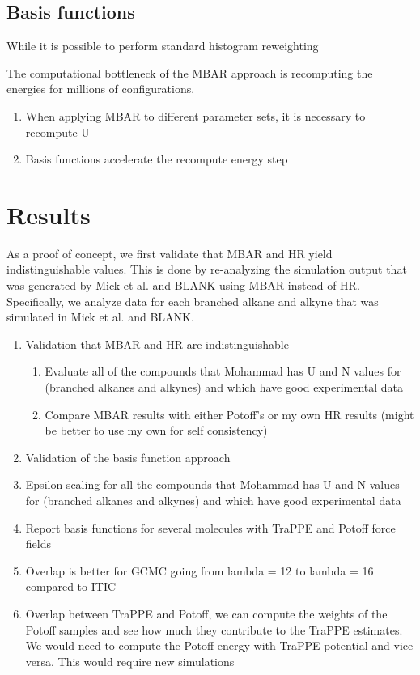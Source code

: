 \documentclass[11pt,a4paper]{article}
\begin{document}
\subsection{Basis functions}

While it is possible to perform standard histogram reweighting 

The computational bottleneck of the MBAR approach is recomputing the energies for millions of configurations. 

\begin{enumerate}
	\item When applying MBAR to different parameter sets, it is necessary to recompute U
	\item Basis functions accelerate the recompute energy step
\end{enumerate}

\section{Results}

As a proof of concept, we first validate that MBAR and HR yield indistinguishable values. This is done by re-analyzing the simulation output that was generated by Mick et al. and BLANK using MBAR instead of HR. Specifically, we analyze data for each branched alkane and alkyne that was simulated in Mick et al. and BLANK.  

\begin{enumerate}
	\item Validation that MBAR and HR are indistinguishable
	\begin{enumerate}
		\item Evaluate all of the compounds that Mohammad has U and N values for (branched alkanes and alkynes) and which have good experimental data
		\item Compare MBAR results with either Potoff's or my own HR results (might be better to use my own for self consistency)
	\end{enumerate}
    \item Validation of the basis function approach
    \item Epsilon scaling for all the compounds that Mohammad has U and N values for (branched alkanes and alkynes) and which have good experimental data
    \item Report basis functions for several molecules with TraPPE and Potoff force fields
    \item Overlap is better for GCMC going from lambda = 12 to lambda = 16 compared to ITIC
    \item Overlap between TraPPE and Potoff, we can compute the weights of the Potoff samples and see how much they contribute to the TraPPE estimates. We would need to compute the Potoff energy with TraPPE potential and vice versa. This would require new simulations
\end{enumerate}
\end{document}
